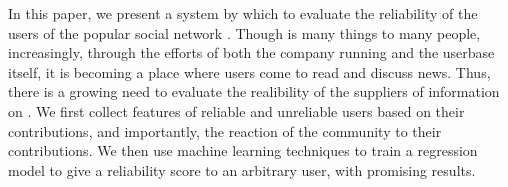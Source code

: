 In this paper, we present a system by which to evaluate the reliability of the
users of the popular social network \reddit{}. Though \reddit{} is many things to many
people, increasingly, through the efforts of both the company running \reddit{} and
the userbase itself, it is becoming a place where users come to read and discuss
news. Thus, there is a growing need to evaluate the realibility of the suppliers
of information on \reddit{}. We first collect features of reliable and unreliable
users based on their contributions, and importantly, the reaction of the
community to their contributions. We then use machine learning techniques to
train a regression model to give a reliability score to an arbitrary user, with
promising results.
